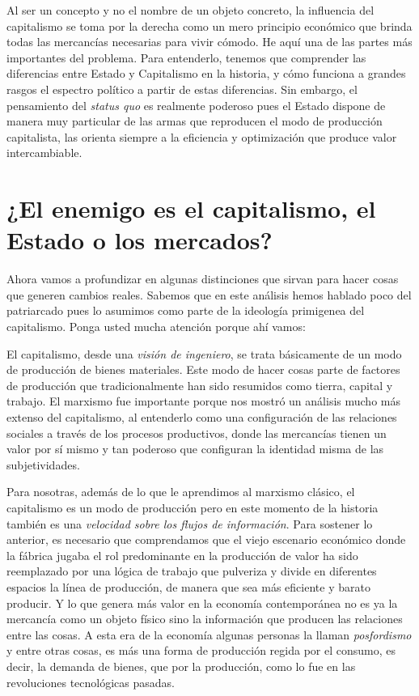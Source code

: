 Al ser un concepto y no el nombre de un objeto concreto, la influencia del capitalismo se toma por la derecha como un mero principio económico que brinda todas las mercancías necesarias para vivir cómodo. He aquí una de las partes más importantes del problema. Para entenderlo, tenemos que comprender las diferencias entre Estado y Capitalismo en la historia, y cómo funciona a grandes rasgos el espectro político a partir de estas diferencias. Sin embargo, el pensamiento del \emph{status quo} es realmente poderoso pues el Estado dispone de manera muy particular de las armas que reproducen el modo de producción capitalista, las orienta siempre a la eficiencia y optimización que produce valor intercambiable.

\section{¿El enemigo es el capitalismo, el Estado o los mercados?}
\label{sec:enemigos}

Ahora vamos a profundizar en algunas distinciones que sirvan para hacer cosas que generen cambios reales. Sabemos que en este análisis hemos hablado poco del patriarcado pues lo asumimos como parte de la ideología primigenea del capitalismo. Ponga usted mucha atención porque ahí vamos:

El capitalismo, desde una \emph{visión de ingeniero}, se trata básicamente de un modo de producción de bienes materiales. Este modo de hacer cosas parte de factores de producción que tradicionalmente han sido resumidos como tierra, capital y trabajo. El marxismo fue importante porque nos mostró un análisis mucho más extenso del capitalismo, al entenderlo como una configuración de las relaciones sociales a través de los procesos productivos, donde las mercancías tienen un valor por sí mismo y tan poderoso que configuran la identidad misma de las subjetividades.

Para nosotras, además de lo que le aprendimos al marxismo clásico, el capitalismo es un modo de producción pero en este momento de la historia también es una \emph{velocidad sobre los flujos de información}. Para sostener lo anterior, es necesario que comprendamos que el viejo escenario económico donde la fábrica jugaba el rol predominante en la producción de valor ha sido reemplazado por una lógica de trabajo que pulveriza y divide en diferentes espacios la línea de producción, de manera que sea más eficiente y barato producir. Y lo que genera más valor en la economía contemporánea no es ya la mercancía como un objeto físico sino la información que producen las relaciones entre las cosas. A esta era de la economía algunas personas la llaman \emph{posfordismo} y entre otras cosas, es más una forma de producción regida por el consumo, es decir, la demanda de bienes, que por la producción, como lo fue en las revoluciones tecnológicas pasadas.

